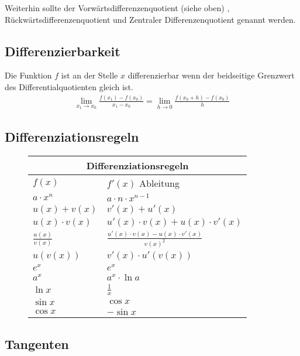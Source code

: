 \documentclass[12pt]{article}
\begin{document}
Weiterhin sollte der Vorwärtsdifferenzenquotient (siehe oben) , Rückwärtsdifferenzenquotient und Zentraler Differenzenquotient genannt werden.


\subsection{ Differenzierbarkeit }

Die Funktion \( f \) ist an der Stelle \( x \) differenzierbar wenn der beidseitige Grenzwert des Differentialquotienten gleich ist.
	\begin{align*}
		\lim_{x_1 \rightarrow x_0}  \frac{f(x_1) - f(x_0)}{x_1 - x_0} = \lim_{h \rightarrow 0} \frac{f(x_0 + h) - f(x_0)}{h}
	\end{align*}

\newpage

\subsection{ Differenziationsregeln}

\begin{figure}[h]
\def\arraystretch{2}\tabcolsep=3pt
\begin{tabular}{ |p{2cm}| p{10cm}|  }
 \hline
 \multicolumn{2}{|c|}{Differenziationsregeln} \\
 \hline
\( f(x) \) & \( f'(x) \) Ableitung\\
 \hline
  \( a \cdot x^n \)  & \( a \cdot n \cdot x^{n - 1} \) \\
  \( u(x) + v(x) \) &  \( v'(x) + u'(x) \) \\
  \( u(x)  \cdot v(x) \) & \( u'(x) \cdot v(x) + u(x) \cdot v'(x) \) \\
  \( \frac{u(x)}{v(x)} \) & \( \frac{u'(x) \cdot v(x) - u(x) \cdot v'(x)}{v(x) ^ 2} \) \\
  \( u(v(x)) \) & \( v'(x) \cdot u'(v(x)) \) \\
  \( e^x \) & \( e^x \) \\
  \( a^x \) & \( a^x \cdot \ln a \) \\
 \( \ln x \) & \( \frac{ 1 }{ x } \) \\
 \( \sin x \) & \( \cos x \) \\
 \( \cos x \) & \( - \sin x \) \\

 \hline
\end{tabular} 
\centering
\end{figure}

\subsection{ Tangenten }
\end{document}
